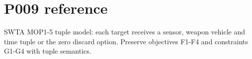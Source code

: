 \section*{P009 reference}\nConfigurable SWTA MOP1-5 tuple model: each target receives a sensor, weapon vehicle and time tuple or the zero discard option. Preserve objectives F1-F4 and constraints G1-G4 with tuple semantics.\n